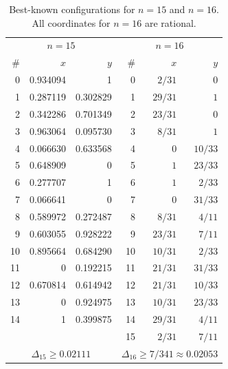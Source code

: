 \documentclass[11pt,a4paper]{article}
\theoremstyle{plain}
\theoremstyle{definition}
\theoremstyle{remark}
\begin{document}
\begin{table}[ht]
\centering
\caption{Best-known configurations for $n=15$ and $n=16$. All coordinates for $n=16$ are rational.}
\label{tab:bestknown-1516}
{\small
\begin{tabular}{r r@{\hskip 6pt} r @{\hskip 14pt} r r@{\hskip 6pt} r}
\toprule
\multicolumn{3}{c}{$n=15$} & \multicolumn{3}{c}{$n=16$} \\
\# & $x$ & $y$ & \# & $x$ & $y$ \\
\midrule
0 & 0.934094 & 1         & 0 & $2/31$ & $0$ \\
1 & 0.287119 & 0.302829 & 1 & $29/31$ & $1$ \\
2 & 0.342286 & 0.701349 & 2 & $23/31$ & $0$ \\
3 & 0.963064 & 0.095730 & 3 & $8/31$ & $1$ \\
4 & 0.066630 & 0.633568 & 4 & $0$ & $10/33$ \\
5 & 0.648909 & 0         & 5 & $1$ & $23/33$ \\
6 & 0.277707 & 1         & 6 & $1$ & $2/33$ \\
7 & 0.066641 & 0         & 7 & $0$ & $31/33$ \\
8 & 0.589972 & 0.272487 & 8 & $8/31$ & $4/11$ \\
9 & 0.603055 & 0.928222 & 9 & $23/31$ & $7/11$ \\
10 & 0.895664 & 0.684290 & 10 & $10/31$ & $2/33$ \\
11 & 0 & 0.192215        & 11 & $21/31$ & $31/33$ \\
12 & 0.670814 & 0.614942 & 12 & $21/31$ & $10/33$ \\
13 & 0 & 0.924975        & 13 & $10/31$ & $23/33$ \\
14 & 1 & 0.399875        & 14 & $29/31$ & $4/11$ \\
   &   &                 & 15 & $2/31$ & $7/11$ \\
\midrule
\multicolumn{3}{c}{$\Delta_{15} \ge 0.02111$}
& \multicolumn{3}{c}{$\Delta_{16} \ge 7/341 \approx 0.02053$} \\
\bottomrule
\end{tabular}}
\end{table}
\end{document}
